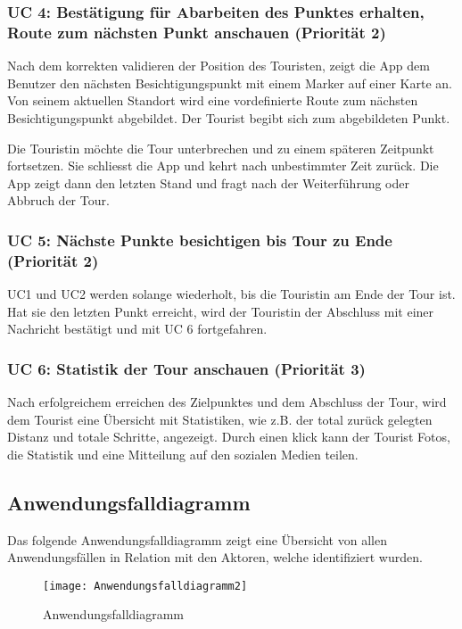 \subsubsection{UC 4: Bestätigung für Abarbeiten des Punktes erhalten, Route zum nächsten Punkt anschauen (Priorität 2)}\label{uc-4-user-bekommt-bestuxe4tigung-fuxfcr-das-abarbeiten-des-punktes-die-route-zum-nuxe4chsten-punkt-wird-angezeigt.-priorituxe4t-2}
\label{erfolgszenario-2}
Nach dem korrekten validieren der Position des Touristen, zeigt die App
dem Benutzer den nächsten Besichtigungspunkt mit einem Marker auf einer
Karte an. Von seinem aktuellen Standort wird eine vordefinierte Route
zum nächsten Besichtigungspunkt abgebildet. Der Tourist begibt sich zum
abgebildeten Punkt.


\label{alternativszenario-1}
Die Touristin möchte die Tour unterbrechen und zu einem späteren
Zeitpunkt fortsetzen. Sie schliesst die App und kehrt nach unbestimmter
Zeit zurück. Die App zeigt dann den letzten Stand und fragt nach der
Weiterführung oder Abbruch der Tour.


\subsubsection{UC 5: Nächste Punkte besichtigen bis Tour zu Ende (Priorität 2)}\label{uc-5-user-besucht-nuxe4chste-punkte-bis-tour-zu-ende.-priorituxe4t-2}
UC1 und UC2 werden solange wiederholt, bis die Touristin am Ende der Tour
ist. Hat sie den letzten Punkt erreicht, wird der Touristin der Abschluss
mit einer Nachricht bestätigt und mit UC 6 fortgefahren.


\subsubsection{UC 6: Statistik der Tour anschauen (Priorität 3)}\label{uc-6-user-sieht-statistik-der-tour.-priorituxe4t-3}
Nach erfolgreichem erreichen des Zielpunktes und dem Abschluss der Tour,
wird dem Tourist eine Übersicht mit Statistiken, wie z.B. der total
zurück gelegten Distanz und totale Schritte, angezeigt. Durch einen klick
kann der Tourist Fotos, die Statistik und eine Mitteilung auf den
sozialen Medien teilen.


\subsection{Anwendungsfalldiagramm}\label{anwendungsfalldiagramm}
Das folgende Anwendungsfalldiagramm zeigt eine Übersicht von allen Anwendungsfällen in Relation mit den Aktoren, welche identifiziert wurden.

\begin{figure}
  \centering
  \texttt{[image: Anwendungsfalldiagramm2]}
  \caption{Anwendungsfalldiagramm}
\end{figure}
